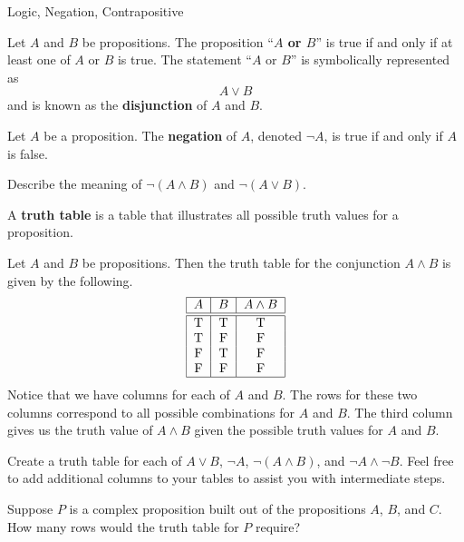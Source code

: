 \begin{section}{Logic, Negation, Contrapositive}
\begin{definition}
Let $A$ and $B$ be propositions.  The proposition ``\textbf{$A$ or $B$}'' is true if and only if at least one of $A$ or $B$ is true.  The statement ``$A$ or $B$'' is symbolically represented as
\[
A \vee B
\]
and is known as the \textbf{disjunction} of $A$ and $B$.
\end{definition}

\begin{definition}
Let $A$ be a proposition.  The \textbf{negation} of $A$, denoted $\neg A$, is true if and only if $A$ is false.
\end{definition}

\begin{exercise}Describe the meaning of $\neg (A \wedge B)$ and $\neg (A \vee B)$.
\end{exercise}

\begin{definition}
A \textbf{truth table} is a table that illustrates all possible truth values for a proposition.  
\end{definition}

\begin{example}
Let $A$ and $B$ be propositions.  Then the truth table for the conjunction $A\wedge B$ is given by the following.
\[
\begin{tabular}{| c | c  | c |} \hline
$A$  &  $B$ & $A \wedge B$  \\ \hline\hline
T & T & T  \\ 
T & F & F  \\ 
F & T & F  \\ 
F & F & F  \\ \hline
\end{tabular}
\]
Notice that we have columns for each of $A$ and $B$.  The rows for these two columns correspond to all possible combinations for $A$ and $B$.  The third column gives us the truth value of $A\wedge B$ given the possible truth values for $A$ and $B$.
\end{example}

\begin{exercise}
Create a truth table for each of $A \vee B$, $\neg A$, $\neg (A \wedge B)$, and $\neg A \wedge \neg B$.  Feel free to add additional columns to your tables to assist you with intermediate steps.
\end{exercise}

\begin{exercise}
Suppose $P$ is a complex proposition built out of the propositions $A$, $B$, and $C$.  How many rows would the truth table for $P$ require?
\end{exercise}


\end{section}

